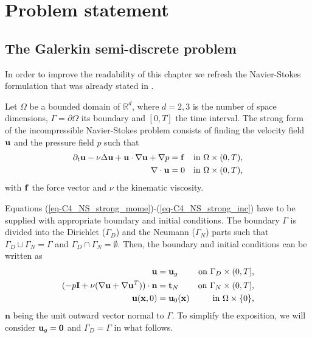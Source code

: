 \section{Problem statement}
\label{sec-C4_prob_statement}
\subsection{The Galerkin semi-discrete problem}
\label{subsec-C4_NS_formulation}
In order to improve the readability of this chapter we refresh the Navier-Stokes formulation that was already stated in . 

Let $\Omega$ be a bounded domain of $\mathbb{R}^d$, where $d=2,3$ is the number of space dimensions, $\Gamma=\partial\Omega$ its boundary and $[0,T]$ the time interval. The strong form of the incompressible Navier-Stokes problem consists of finding the velocity field ${\bf u}$ and the pressure field $p$ such that 
\begin{align}
\label{eq-C4_NS_strong_mome}
\partial_t{\bf u}-\nu\Delta{\bf u}+{\bf u}\cdot\nabla{\bf u}+\nabla p&={\bf f}&\mbox{in $\Omega\times(0,T)$,}\\
\label{eq-C4_NS_strong_inc}
\nabla\cdot{\bf u}&=0&\mbox{in $\Omega\times(0,T)$,}
\end{align}
with ${\bf f}$ the force vector and $\nu$ the kinematic viscosity. 

Equations (\ref{eq-C4_NS_strong_mome})-(\ref{eq-C4_NS_strong_inc}) have to be supplied with appropriate boundary and initial conditions. The boundary $\Gamma$ is divided into the Dirichlet ($\Gamma_D$) and the Neumann ($\Gamma_N$) parts such that $\Gamma_D\cup\Gamma_N=\Gamma$ and $\Gamma_D\cap\Gamma_N=\emptyset$. Then, the boundary and initial conditions can be written as
\begin{align}
\label{eq-C4_NS_strong_Dir}
{\bf u}&={\bf u}_g&\mbox{on $\Gamma_D\times(0,T]$,}\\
\label{eq-C4_NS_strong_Neu}
(-p \mathbf{I}+\nu(\nabla{\bf u}+\nabla{\bf u}^T))\cdot\mathbf{n}&=\mathbf{t}_N&\mbox{on $\Gamma_N\times(0,T]$,}\\
\label{eq-C4_NS_strong_Ini}
{\bf u}({\bf x},0)&={\bf u}_0({\bf x})&\mbox{in $\Omega\times\{0\}$,}
\end{align}
$\mathbf{n}$ being the unit outward vector normal to $\Gamma$. To simplify the exposition, we will consider ${\bf u}_g = {\bf 0}$ and $\Gamma_D = \Gamma$ in what follows.

